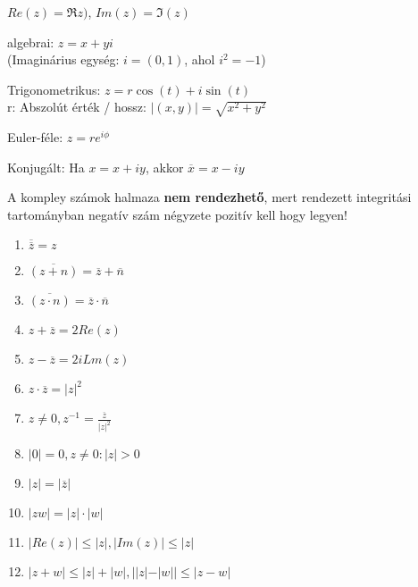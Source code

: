 \begin{frame}
\begin{tcolorbox}[title={Alakok}]
$Re(z) = {\Re}z)$, $Im(z) = {\Im}(z)$\\
\mmedskip

algebrai: $z = x + yi$\\
(Imaginárius egység: $i = (0, 1)$, ahol $i^2 = -1$)\\
\mmedskip

Trigonometrikus: $z = r{\cos}(t) + i{\sin}(t)$\\
r: Abszolút érték / hossz: $|(x, y)| = \sqrt{x^2 + y^2}$\\
\mmedskip

Euler-féle: $z = re^{i{\phi}}$\\
\mmedskip

Konjugált: Ha $x = x + iy$, akkor $\overline{x} = x - iy$\\
\mmedskip

A kompley számok halmaza \textbf{nem rendezhető}, mert rendezett integritási tartományban negatív szám négyzete pozitív kell hogy legyen!
\end{tcolorbox}

\begin{tcolorbox}[title={Ész}]
\begin{enumerate}
\item $\overline{\overline{z}} = z$
\item $\overline{(z + n)} = \overline{z} + \overline{n}$
\item $\overline{(z \cdot n)} = \overline{z} \cdot \overline{n}$
\item $z + \overline{z} = 2Re(z)$
\item $z - \overline{z} = 2iLm(z)$
\item $z \cdot \overline{z} = |z|^2$
\item $z \neq 0, z^{-1} = \frac{\overline{z}}{|z|^2}$
\item $|0| = 0, z \neq 0 : |z| > 0$
\item $|z| = |\overline{z}|$
\item $|zw| = |z| \cdot |w|$
\item $|Re(z)| \leq |z|, |Im(z)| \leq |z|$
\item $|z + w| \leq |z| + |w|, ||z| - |w|| \leq |z - w|$
\end{enumerate}
\end{tcolorbox}
\end{frame}

